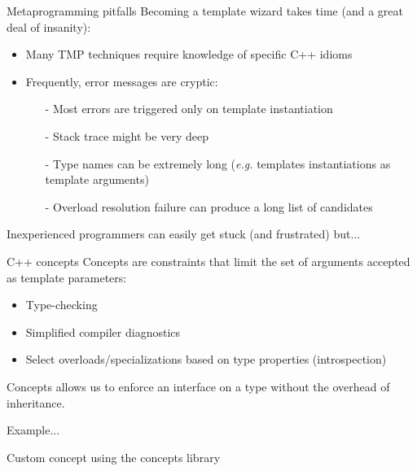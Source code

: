 \documentclass{beamer}
\begin{document}
\begin{frame}{Metaprogramming pitfalls}
	Becoming a template wizard takes time (and a great deal of insanity):
	\begin{itemize}
		\item Many TMP techniques require knowledge of specific C++ idioms
		\item Frequently, error messages are cryptic:
		\begin{itemize}
			\item[-] Most errors are triggered only on template instantiation
			\item[-] Stack trace might be very deep
			\item[-] Type names can be extremely long (\textit{e.g.} templates instantiations as template arguments)
			\item[-] Overload resolution failure can produce a long list of candidates
		\end{itemize} 
	\end{itemize}

	Inexperienced programmers can easily get stuck (and frustrated) but...
	\begin{center}
	\end{center}
\end{frame}

\begin{frame}{C++ concepts}
	Concepts are constraints that limit the set of arguments accepted as template parameters:
	\begin{itemize}
		\item Type-checking
		\item Simplified compiler diagnostics
		\item Select overloads/specializations based on type properties (introspection)
	\end{itemize}
	\vspace{5pt}
	Concepts allows us to enforce an interface on a type without the overhead of inheritance.\\
	\begin{flushright}
		Example...
	\end{flushright}
\end{frame}

\begin{frame}{Custom concept using the concepts library}
	
\end{frame}
\end{document}
